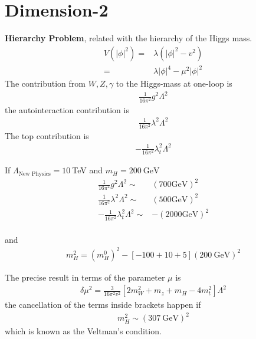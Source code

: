 \documentclass[12pt,letterpaper]{article}
\begin{document}
\section{Dimension-2}

\textbf{Hierarchy Problem}, related with the hierarchy of the Higgs
mass.
\begin{align*}
  V(|\phi|^2)=&\lambda \left( |\phi|^2-v^2 \right)\nonumber\\
            =&\lambda|\phi|^4-\mu^2|\phi|^2
\end{align*}
The contribution from $W,Z,\gamma$ to the Higgs-mass at one-loop is
\begin{align*}
  \frac{1}{16\pi^2}g^2\Lambda^2
\end{align*}
the autointeraction contribution is
\begin{align*}
  \frac{1}{16\pi^2}\lambda^2\Lambda^2
\end{align*}
The top contribution is
\begin{align*}
    -\frac{1}{16\pi^2}\lambda_t^2\Lambda^2
\end{align*}


If $\Lambda_{\text{New Physics}}=10\ $TeV and $m_H=200\ \text{GeV}$
\begin{align}
  \frac{1}{16\pi^2}g^2\Lambda^2\sim &(700\text{GeV})^2\\
  \frac{1}{16\pi^2}\lambda^2\Lambda^2\sim & (500\text{GeV})^2\\
-\frac{1}{16\pi^2}\lambda_t^2\Lambda^2\sim & -(2000\text{GeV})^2\\
\end{align}

and
\begin{align*}
  m_H^2=\left( m_H^0 \right)^2-[-100+10+5]\left( 200\ \text{GeV} \right)^2
\end{align*}

The precise result in terms of the parameter $\mu$ is
\begin{align*}
  \delta \mu^2 =\frac{3}{16\pi^2v^2}
\left[2m_W^2+m_z+m_H-4 m_t^2  \right]\Lambda^2
\end{align*}
the cancellation of the terms inside brackets happen if
\begin{align*}
  m_H^2\sim (307\ \text{GeV})^2
\end{align*}
which is known as the Veltman's condition. 
\end{document}
